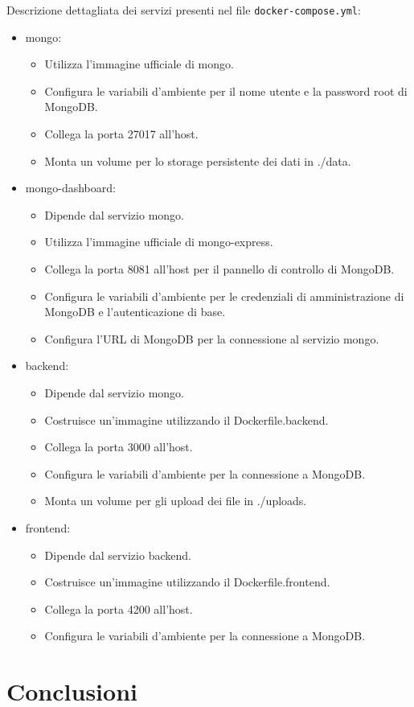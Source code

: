 \documentclass[12pt,a4paper,openright,twoside]{book}
\begin{document}
Descrizione dettagliata dei servizi presenti nel file \texttt{docker-compose.yml}:

\begin{itemize}
    \item mongo:
    \begin{itemize}
        \item Utilizza l'immagine ufficiale di mongo.
        \item Configura le variabili d'ambiente per il nome utente e la password root di MongoDB.
        \item Collega la porta 27017 all'host.
        \item Monta un volume per lo storage persistente dei dati in ./data.
    \end{itemize}
    \item mongo-dashboard:
    \begin{itemize}
        \item Dipende dal servizio mongo.
        \item Utilizza l'immagine ufficiale di mongo-express.
        \item Collega la porta 8081 all'host per il pannello di controllo di MongoDB.
        \item Configura le variabili d'ambiente per le credenziali di amministrazione di MongoDB e l'autenticazione di base.
        \item Configura l'URL di MongoDB per la connessione al servizio mongo.
    \end{itemize}
    \item backend:
    \begin{itemize}
        \item Dipende dal servizio mongo.
        \item Costruisce un'immagine utilizzando il Dockerfile.backend.
        \item Collega la porta 3000 all'host.
        \item Configura le variabili d'ambiente per la connessione a MongoDB.
        \item Monta un volume per gli upload dei file in ./uploads.
    \end{itemize}
    \item frontend:
    \begin{itemize}
        \item Dipende dal servizio backend.
        \item Costruisce un'immagine utilizzando il Dockerfile.frontend.
        \item Collega la porta 4200 all'host.
        \item Configura le variabili d'ambiente per la connessione a MongoDB.
    \end{itemize}
\end{itemize}

\chapter{Conclusioni}



\end{document}
